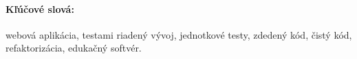 \documentclass[12pt, oneside]{book}  %
\begin{document}
\paragraph*{Kľúčové slová:} webová aplikácia, testami riadený vývoj, jednotkové testy, zdedený kód, čistý kód, refaktorizácia, edukačný softvér.


%
%



\newpage 

\tableofcontents



\newpage 

\listoffigures


\mainmatter


 













\newpage	

\backmatter

\thispagestyle{empty}
\nocite{*}
\clearpage




 
\end{document}
